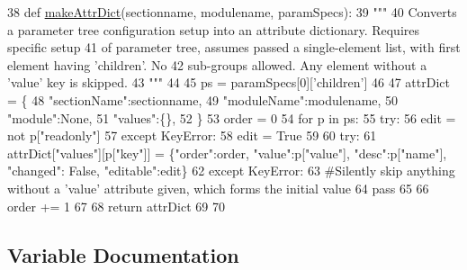 \begin{DoxyCode}
38 \textcolor{keyword}{def }\hyperlink{namespacesoftware_1_1chipwhisperer_1_1common_1_1traces_1_1__cfgfile_ae5242f90d9cfb290f14d59027088de1e}{makeAttrDict}(sectionname, modulename, paramSpecs):
39     \textcolor{stringliteral}{"""}
40 \textcolor{stringliteral}{    Converts a parameter tree configuration setup into an attribute dictionary. Requires specific setup}
41 \textcolor{stringliteral}{    of parameter tree, assumes passed a single-element list, with first element having 'children'. No}
42 \textcolor{stringliteral}{    sub-groups allowed. Any element without a 'value' key is skipped.}
43 \textcolor{stringliteral}{    """}
44     
45     ps = paramSpecs[0][\textcolor{stringliteral}{'children'}]
46     
47     attrDict = \{
48                 \textcolor{stringliteral}{"sectionName"}:sectionname,
49                 \textcolor{stringliteral}{"moduleName"}:modulename,
50                 \textcolor{stringliteral}{"module"}:\textcolor{keywordtype}{None},
51                 \textcolor{stringliteral}{"values"}:\{\},
52                 \}    
53     order = 0    
54     \textcolor{keywordflow}{for} p \textcolor{keywordflow}{in} ps:
55         \textcolor{keywordflow}{try}:
56             edit = \textcolor{keywordflow}{not} p[\textcolor{stringliteral}{"readonly"}]
57         \textcolor{keywordflow}{except} KeyError:
58             edit = \textcolor{keyword}{True}
59             
60         \textcolor{keywordflow}{try}:
61             attrDict[\textcolor{stringliteral}{"values"}][p[\textcolor{stringliteral}{"key"}]] = \{\textcolor{stringliteral}{"order"}:order, \textcolor{stringliteral}{"value"}:p[\textcolor{stringliteral}{"value"}], \textcolor{stringliteral}{"desc"}:p[\textcolor{stringliteral}{"name"}], \textcolor{stringliteral}{"changed"}:\textcolor{keyword}{
      False}, \textcolor{stringliteral}{"editable"}:edit\}
62         \textcolor{keywordflow}{except} KeyError:
63             \textcolor{comment}{#Silently skip anything without a 'value' attribute given, which forms the initial value}
64             \textcolor{keywordflow}{pass}
65         
66         order += 1
67         
68     \textcolor{keywordflow}{return} attrDict
69     
70    
\end{DoxyCode}


\subsection{Variable Documentation}
\hypertarget{namespacesoftware_1_1chipwhisperer_1_1common_1_1traces_1_1__cfgfile_ace8a3b8ccc370e5d6fc081e07eb5ea19}{}
